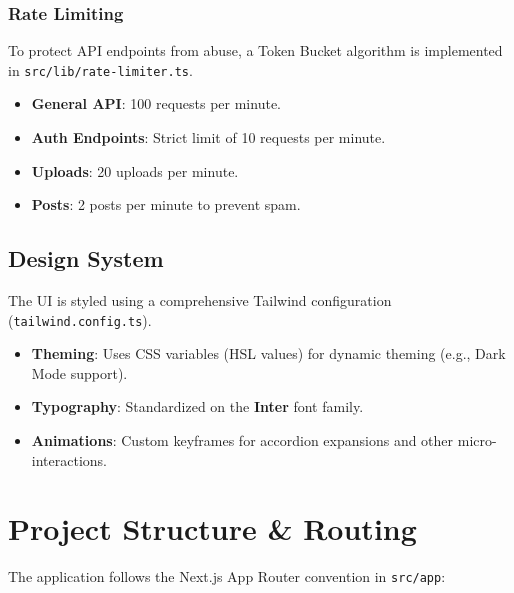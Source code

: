 \documentclass{article}
\begin{document}
\subsubsection{Rate Limiting}
To protect API endpoints from abuse, a Token Bucket algorithm is implemented in \texttt{src/lib/rate-limiter.ts}.
\begin{itemize}
    \item \textbf{General API}: 100 requests per minute.
    \item \textbf{Auth Endpoints}: Strict limit of 10 requests per minute.
    \item \textbf{Uploads}: 20 uploads per minute.
    \item \textbf{Posts}: 2 posts per minute to prevent spam.
\end{itemize}

\subsection{Design System}
The UI is styled using a comprehensive Tailwind configuration (\texttt{tailwind.config.ts}).
\begin{itemize}
    \item \textbf{Theming}: Uses CSS variables (HSL values) for dynamic theming (e.g., Dark Mode support).
    \item \textbf{Typography}: Standardized on the \textbf{Inter} font family.
    \item \textbf{Animations}: Custom keyframes for accordion expansions and other micro-interactions.
\end{itemize}

\section{Project Structure \& Routing}
The application follows the Next.js App Router convention in \texttt{src/app}:
\end{document}
